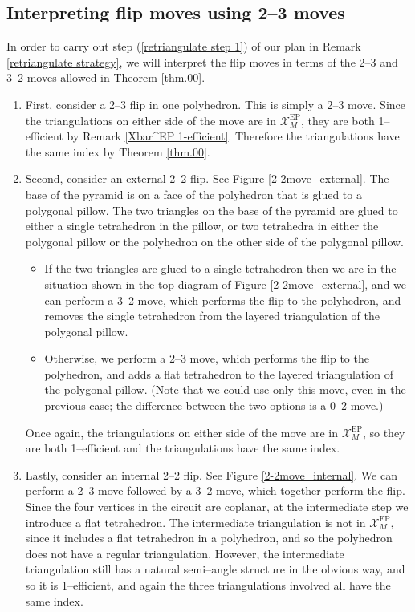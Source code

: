 \documentclass[12pt]{amsart}
\theoremstyle{definition}
\theoremstyle{remark}
\def\calX{\mathcal X}
\def\EP{\mathrm{EP}}
\begin{document}
\subsection{Interpreting flip moves using 2--3 moves}

In order to carry out step (\ref{retriangulate step 1}) of our plan in Remark \ref{retriangulate strategy}, we will interpret the flip moves in terms of the 2--3 and 3--2 moves allowed in Theorem \ref{thm.00}. 
\begin{enumerate}
\item First, consider a 2--3 flip in one polyhedron. This is simply a 2--3 move. Since the triangulations on either side of the move are in $\calX_M^{\EP}$, they are both 1--efficient by Remark \ref{Xbar^EP 1-efficient}. Therefore the triangulations have the same index by Theorem \ref{thm.00}.

\item Second, consider an external 2--2 flip. See Figure \ref{2-2move_external}. The base of the pyramid is on a face of the polyhedron that is glued to a polygonal pillow. The two triangles on the base of the pyramid are glued to either a single tetrahedron in the pillow, or two tetrahedra in either the polygonal pillow or the polyhedron on the other side of the polygonal pillow.
\begin{itemize}
\item If the two triangles are glued to a single tetrahedron then we are in the situation shown in the top diagram of Figure \ref{2-2move_external}, and we can perform a 3--2 move, which performs the flip to the polyhedron, and removes the single tetrahedron from the layered triangulation of the polygonal pillow. 
\item Otherwise, we perform a 2--3 move, which performs the flip to the polyhedron, and adds a flat tetrahedron to the layered triangulation of the polygonal pillow. (Note that we could use only this move, even in the previous case; the difference between the two options is a 0--2 move.)
\end{itemize}
Once again, the triangulations on either side of the move are in $\calX_M^{\EP}$, so they are both 1--efficient and the triangulations have the same index.

\item Lastly, consider an internal 2--2 flip. See Figure \ref{2-2move_internal}. We can perform a 2--3 move followed by a 3--2 move, which together perform the flip. Since the four vertices in the circuit are coplanar, at the intermediate step we introduce a flat tetrahedron. The intermediate triangulation is not in $\calX_M^{\EP}$, since it includes a flat tetrahedron in a polyhedron, and so the polyhedron does not have a regular triangulation. However, the intermediate triangulation still has a natural semi--angle structure in the obvious way, and so it is 1--efficient, and again the three triangulations involved all have the same index.
\end{enumerate}
\end{document}
